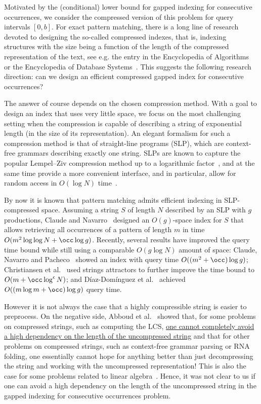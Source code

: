 Motivated by the (conditional) lower bound for gapped indexing for consecutive occurrences, we consider
the compressed version of this problem for query intervals $[0,b]$. For exact pattern matching, there is a long line of research
devoted to designing the so-called compressed indexes, that is, indexing structures with the size being a function of
the length of the compressed representation of the text, see e.g. the entry in the Encyclopedia of Algorithms~\cite{MakinenN16}
or the Encyclopedia of Database Systems~\cite{FerraginaV18}.
This suggests the following research direction: can we design an efficient compressed gapped index for consecutive
occurrences? 

The answer of course depends on the chosen compression method. With a goal to design an index that uses very little space, we focus on the most challenging  setting when the compression is capable of describing a string of exponential length (in the size of its representation). An elegant formalism for such a compression method is that of straight-line programs (SLP), which are context-free grammars describing exactly one string. SLPs are known to capture the popular Lempel--Ziv compression method up to a logarithmic factor~\cite{CharikarLLPPRSS02,Rytter02}, and at the same time provide a more convenient interface, and in particular, allow for random access in $O(\log N)$ time~\cite{random_access_grammar_compress}. 

By now it is known that pattern matching admits efficient indexing in SLP-compressed space. Assuming a string $S$ of length $N$ described by an SLP with $g$ productions, Claude and Navarro~\cite{spire/ClaudeN12a} designed an $O(g)$-space index for $S$ that allows retrieving all occurrences of a pattern of length $m$ in time $O(m^2 \log \log N + \occ \log g)$. 
Recently, several results have improved the query time bound while still using a comparable $O(g\log N)$ amount of space: Claude, Navarro and Pacheco~\cite{CNP2021} showed an index with query time $O((m^2 + \occ)  \log g)$; Christiansen et al.~\cite{talg/ChristiansenEKN21} used strings attractors to further improve the time bound to $O(m + \occ \log^\epsilon N)$; and Díaz-Domínguez et al.~\cite{spire/DNP2021} achieved $O((m \log m +\occ)\log g)$ query time. 

However it is not always the case that a highly compressible string is easier to preprocess.
On the negative side, Abboud et al.~\cite{AbboudBBK17} showed that,
for some problems on compressed strings,
such as computing the LCS, \ul{one cannot completely avoid a high dependency on the length of the uncompressed
string} and that for other problems on compressed strings, such as context-free grammar parsing or RNA folding,
one essentially cannot hope for anything better than just decompressing the string and working with the
uncompressed representation! This is also the case for some problems related to linear algebra~\cite{AbboudBBK20}. Hence, it was not clear to us if one can avoid a high dependency on the length of the uncompressed string
in the gapped indexing for consecutive occurrences problem. 

